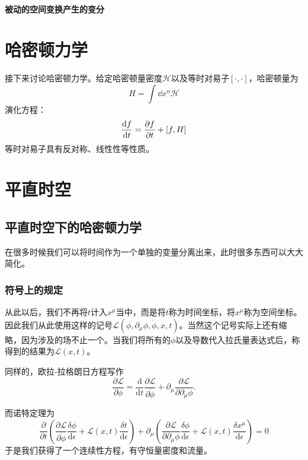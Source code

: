 \documentclass[UTF8, a4paper]{ctexart}
\begin{document}
\paragraph{被动的空间变换产生的变分}

\section{哈密顿力学}\label{sec:hamiltionian-dynamics}

接下来讨论哈密顿力学。给定哈密顿量密度$\mathcal{H}$以及等时对易子$[\cdot, \cdot]$，哈密顿量为
\begin{equation}
    H = \int \dd x^n \mathcal{H}
\end{equation}
演化方程：
\begin{equation}
    \dv{f}{t} = \pdv{f}{t} + [f, H]
\end{equation}
等时对易子具有反对称、线性性等性质。

\section{平直时空}

\subsection{平直时空下的哈密顿力学}
在很多时候我们可以将时间作为一个单独的变量分离出来，此时很多东西可以大大简化。

\subsubsection{符号上的规定}
从此以后，我们不再将$t$计入$x^\mu$当中，而是将$t$称为时间坐标，将$x^\mu$称为空间坐标。因此我们从此使用这样的记号$\mathcal{L}(\phi, \partial_\mu \phi, \dot{\phi}, x, t)$。当然这个记号实际上还有缩略，因为涉及的场不止一个。当我们将所有的$\phi$以及导数代入拉氏量表达式后，称得到的结果为$\mathcal{L}(x, t)$。

同样的，欧拉-拉格朗日方程写作
\begin{equation}
    \frac{\partial \mathcal{L}}{\partial \phi} = \frac{\mathrm{d}}{\mathrm{d}t} \frac{\partial \mathcal{L}}{\partial \dot{\phi}} + \partial_\mu \frac{\partial \mathcal{L}}{\partial \partial_\mu \phi}. 
\end{equation}

而诺特定理为
\begin{equation}
    \frac{\partial}{\partial t} \left( \frac{\partial \mathcal{L}}{\partial \dot{\phi}} \frac{\delta \phi}{\mathrm{d} \epsilon} + \mathcal{L}(x, t) \frac{\delta t}{\mathrm{d} \epsilon} \right) + \partial_\mu \left( \frac{\partial \mathcal{L}}{\partial \partial_\mu \phi} \frac{\delta \phi}{\mathrm{d} \epsilon} + \mathcal{L}(x, t) \frac{\delta x^\mu}{\mathrm{d} \epsilon} \right) = 0
\end{equation}
于是我们获得了一个连续性方程，有守恒量密度和流量。
\end{document}
